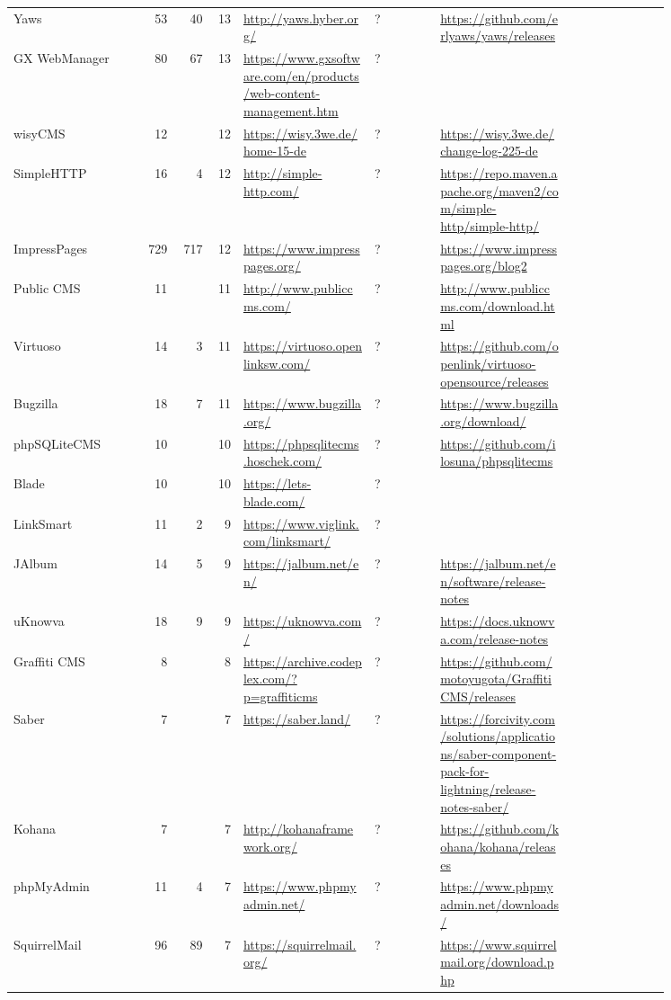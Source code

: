 \begin{longtable}{|p{0.2\linewidth}|r|r|r|p{0.2\linewidth}|p{0.1\linewidth}|p{0.2\linewidth}|p{0.15\linewidth}|}
	Yaws &53 &40 &13 &\url{http://yaws.hyber.org/} &? &\url{https://github.com/erlyaws/yaws/releases} \\
	GX WebManager &80 &67 &13 &\url{https://www.gxsoftware.com/en/products/web-content-management.htm} &? & \\
	wisyCMS &12 & &12 &\url{https://wisy.3we.de/home-15-de} &? &\url{https://wisy.3we.de/change-log-225-de} \\
	SimpleHTTP &16 &4 &12 &\url{http://simple-http.com/} &? &\url{https://repo.maven.apache.org/maven2/com/simple-http/simple-http/} \\
	ImpressPages &729 &717 &12 &\url{https://www.impresspages.org/} &? &\url{https://www.impresspages.org/blog2} \\
	Public CMS &11 & &11 &\url{http://www.publiccms.com/} &? &\url{http://www.publiccms.com/download.html} \\
	Virtuoso &14 &3 &11 &\url{https://virtuoso.openlinksw.com/} &? &\url{https://github.com/openlink/virtuoso-opensource/releases} \\
	Bugzilla &18 &7 &11 &\url{https://www.bugzilla.org/} &? &\url{https://www.bugzilla.org/download/} \\
	phpSQLiteCMS &10 & &10 &\url{https://phpsqlitecms.hoschek.com/} &? &\url{https://github.com/ilosuna/phpsqlitecms} \\
	Blade &10 & &10 &\url{https://lets-blade.com/} &? & \\
	LinkSmart &11 &2 &9 &\url{https://www.viglink.com/linksmart/} &? & \\
	JAlbum &14 &5 &9 &\url{https://jalbum.net/en/} &? &\url{https://jalbum.net/en/software/release-notes} \\
	uKnowva &18 &9 &9 &\url{https://uknowva.com/} &? &\url{https://docs.uknowva.com/release-notes} \\
	Graffiti CMS &8 & &8 &\url{https://archive.codeplex.com/?p=graffiticms} &? &\url{https://github.com/motoyugota/GraffitiCMS/releases} \\
	Saber &7 & &7 &\url{https://saber.land/} &? &\url{https://forcivity.com/solutions/applications/saber-component-pack-for-lightning/release-notes-saber/} \\
	Kohana &7 & &7 &\url{http://kohanaframework.org/} &? &\url{https://github.com/kohana/kohana/releases} \\
	phpMyAdmin &11 &4 &7 &\url{https://www.phpmyadmin.net/} &? &\url{https://www.phpmyadmin.net/downloads/} \\
	SquirrelMail &96 &89 &7 &\url{https://squirrelmail.org/} &? &\url{https://www.squirrelmail.org/download.php} \\

\end{longtable}
